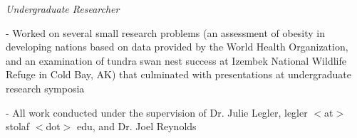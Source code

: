 \documentclass[9pt]{article}
\newenvironment{outerlist}[1][\enskip\textbullet]%
        {\begin{itemize}[#1]}{\end{itemize}%
         }
\newenvironment{innerlist}[1][\enskip\textbullet]%
        {\begin{compactitem}[#1]}{\end{compactitem}}
\begin{document}
		\begin{outerlist}
			\item []\textit{Undergraduate Researcher}
\begin{innerlist}
	\item[-] Worked on several small research problems (an assessment of obesity in developing nations based on data provided by the World Health Organization, and an examination of tundra swan nest success at Izembek National Wildlife Refuge in Cold Bay, AK) that culminated with presentations at undergraduate research symposia
  \vspace{.05in}
  \item[-] All work conducted under the supervision of Dr. Julie Legler, legler $<$at$>$ stolaf $<$dot$>$ edu, and Dr. Joel Reynolds
\end{innerlist}
\end{outerlist}
\vspace{.15in}



\vspace{.15in}
\end{document}
